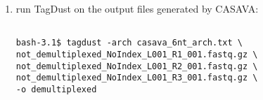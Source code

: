 \documentclass[11pt,a4paper,oneside]{book}
\begin{document}
\begin{enumerate}
\item run TagDust on the output files generated by CASAVA:
\begin{verbatim}

bash-3.1$ tagdust -arch casava_6nt_arch.txt \
not_demultiplexed_NoIndex_L001_R1_001.fastq.gz \
not_demultiplexed_NoIndex_L001_R2_001.fastq.gz \
not_demultiplexed_NoIndex_L001_R3_001.fastq.gz \
-o demultiplexed
\end{verbatim}




\end{enumerate}


    

%

\end{document}
